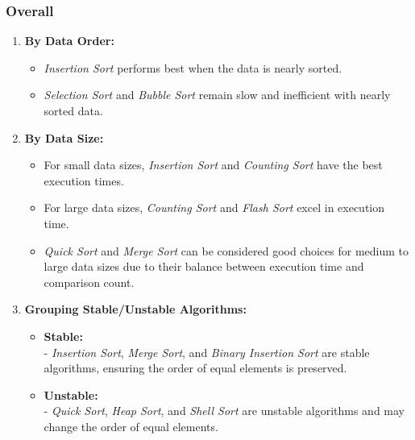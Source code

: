 \subsubsection{Overall}
\begin{enumerate}
    \item \textbf{By Data Order:}
    \begin{itemize}[label=-]
        \item  \textit{Insertion Sort} performs best when the data is nearly sorted.
        \item \textit{Selection Sort} and \textit{Bubble Sort} remain slow and inefficient with nearly sorted data.
    \end{itemize}
    
    \item \textbf{By Data Size:}
    \begin{itemize}[label=-]
        \item  For small data sizes, \textit{Insertion Sort} and \textit{Counting Sort} have the best execution times.
        \item  For large data sizes, \textit{Counting Sort} and \textit{Flash Sort} excel in execution time.
        \item \textit{Quick Sort} and \textit{Merge Sort} can be considered good choices for medium to large data sizes due to their balance between execution time and comparison count.
    \end{itemize}
    
    \item \textbf{Grouping Stable/Unstable Algorithms:}
    \begin{itemize}[label=-]
        \item  \textbf{Stable:} \\
  - \textit{Insertion Sort}, \textit{Merge Sort}, and \textit{Binary Insertion Sort} are stable algorithms, ensuring the order of equal elements is preserved.
  
        \item  \textbf{Unstable:} \\
  - \textit{Quick Sort}, \textit{Heap Sort}, and \textit{Shell Sort} are unstable algorithms and may change the order of equal elements.
    \end{itemize}
\end{enumerate}